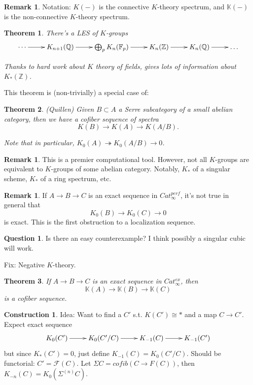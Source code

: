 \documentclass[letterpaper]{article}
\newtheorem{theorem}{Theorem}
\theoremstyle{definition}
\newtheorem{remark}[lemma]{Remark}
\newtheorem{question}{Question}
\newtheorem{construction}{Construction}
\newcommand{\Z}{\mathbb Z}
\newcommand{\mbb}{\mathbb}
\newcommand{\mc}{\mathcal}
\begin{document}
\begin{remark}
Notation: $K(-)$ is the connective $K$-theory spectrum, and $\mbb
K(-)$ is the non-connective $K$-theory spectrum. 
\end{remark}

\begin{theorem}
There's a LES of $K$-groups
\[
\xymatrix{ \cdots \ar[r] & K_{n+1}(\mbb Q) \ar[r] & \bigoplus_{p} K_n(\mbb F_p) \ar[r] &
  K_n(\Z) \ar[r] & K_n(\mbb Q) \ar[r] & \dots}
\]

Thanks to hard work about $K$ theory of fields, gives lots of
information about $K_*(\Z)$.
\end{theorem}

This theorem is (non-trivially) a special case of:

\begin{theorem} (Quillen)
Given $B \subset A$ a Serre subcategory of a small abelian category,
then we have a cofiber sequence of spectra
\[
K(B) \rightarrow K(A) \rightarrow K(A/B).
\]

Note that in particular, $K_0(A) \twoheadrightarrow K_0(A/B)
\rightarrow 0$.
\end{theorem}

\begin{remark}
This is a premier computational tool. However, not all $K$-groups are
equivalent to $K$-groups of some abelian category. Notably, $K_*$ of a
singular scheme, $K_*$ of a ring spectrum, etc. 
\end{remark}

\begin{remark}
If $A \rightarrow B \rightarrow C$ is an exact sequence in
$Cat_{\infty}^{perf}$, it's not true in general that
\[
K_0(B) \rightarrow K_0(C) \rightarrow 0
\]
is exact. This is the first obstruction to a localization sequence. 
\end{remark}

\begin{question}
Is there an easy counterexample? I think possibly a singular cubic
will work. 
\end{question}

Fix: Negative $K$-theory.

\begin{theorem}
If $A \rightarrow B \rightarrow C$ is an exact sequence in
$Cat_{\infty}^{ex}$, then 
\[
\mbb K(A) \rightarrow \mbb K(B) \rightarrow \mbb K(C)
\]
is a cofiber sequence.
\end{theorem}

\begin{construction}
Idea: Want to find a $C'$ s.t. $K(C') \cong *$ and a map $C
\rightarrow C'$. Expect exact sequence
\[
\xymatrix{K_0(C') \ar[r] & K_0(C'/C) \ar[r] & K_{-1}(C) \ar[r] & K_{-1}(C')}
\]
but since $K_*(C') = 0$, just define $K_{-1}(C) = K_0(C'/C)$. Should
be functorial: $C' = \mc F(C)$. Let $\Sigma C = cofib(C \rightarrow
F(C))$, then $K_{-n}(C) = K_0(\Sigma^{(n)}C)$.
\end{construction}
\end{document}
